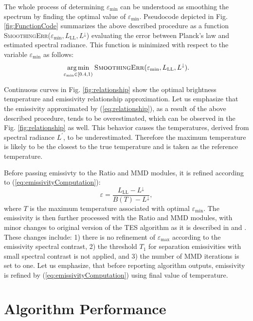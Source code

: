 The whole process of determining $\varepsilon_\mathrm{min}$ can be understood as smoothing the spectrum by finding the optimal value of $\varepsilon_\mathrm{min}$. Pseudocode depicted in Fig. \ref{fig:FunctionCode} summarizes the above described procedure as a function \textsc{SmoothingErr}($\varepsilon_\mathrm{min},L_\mathrm{LL},L^\downarrow$) evaluating the error between Planck's law and estimated spectral radiance. This function is minimized with respect to the variable $\varepsilon_\mathrm{min}$ as follows:
\begin{equation}
\underset{\varepsilon_\mathrm{min} \in [ 0.4 ,1 )}{\text{arg\,min}}\:\text{\textsc{SmoothingErr}}(\varepsilon_\mathrm{min},L_\mathrm{LL},L^\downarrow).
\label{eq:costFunction}
\end{equation}

Continuous curves in Fig. \ref{fig:relationship} show the optimal brightness temperature and emissivity relationship approximation. Let us emphasize that the emissivity approximated by (\ref{eq:relationship}), as a result of the above described procedure, tends to be overestimated, which can be observed in the Fig. \ref{fig:relationship} as well. This behavior causes the temperatures, derived from spectral radiance $L^{\prime}$, to be underestimated. Therefore the maximum temperature is likely to be the closest to the true temperature and is taken as the reference temperature.

Before passing emissivty to the Ratio and MMD modules, it is refined according to (\ref{eq:emissivityComputation}):
\begin{equation}
\varepsilon = \frac{L_\mathrm{LL} - L^\downarrow}{B(T) - L^\downarrow},
\label{eq:emissivityComputation}
\end{equation}
where $T$ is the maximum temperature associated with optimal $\varepsilon_\mathrm{min}$. The emissivity is then further processed with the Ratio and MMD modules, with minor changes to original version of the TES algorithm as it is described in \cite{gillespie_temperature_1998} and \cite{gillespie_temperature/emissivity_1999}. These changes include: 1) there is no refinement of $\varepsilon_\mathrm{max}$ according to the emissivity spectral contrast, 2) the threshold $T_1$ for separation emissivities with small spectral contrast is not applied, and 3) the number of MMD iterations is set to one. Let us emphasize, that before  
reporting algorithm outputs, emissivity is refined by (\ref{eq:emissivityComputation}) using final value of temperature.

\section{Algorithm Performance}

